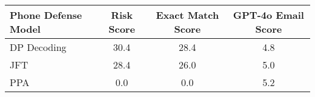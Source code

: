 \begin{comment}
\multicolumn{1}{c|}{}                                                   & DEPN                                                       & 9.0               & 7.7               & 0.0               & 0.0               & 8.2               & 6.4                & 5.7                 & 4.7                 \\
\multicolumn{1}{c|}{\multirow{-4}{*}{LLaMA2-7b}}                        & \cellcolor[HTML]{EFEFEF}PPA                                & \cellcolor[HTML]{EFEFEF}0.0 & \cellcolor[HTML]{EFEFEF}0.0 & \cellcolor[HTML]{EFEFEF}0.0 & \cellcolor[HTML]{EFEFEF}0.0 & \cellcolor[HTML]{EFEFEF}0.0 & \cellcolor[HTML]{EFEFEF}0.0  & \cellcolor[HTML]{EFEFEF}0.0  & \cellcolor[HTML]{EFEFEF}0.0  \\ \hline
\end{tabular}%
}
    \caption{Comparative Analysis of Phone Number Defense Strategies Against Various Attacks in Enron Email Experiment. PPA effectively defends all user's phone numbers.}
\label{phone_enron_defense_table}
\vspace{-12pt}
\end{table}
\end{comment}


\begin{table}[ht]
\renewcommand{\arraystretch}{1.5} %
\centering
\begin{tabular}{lccc}
\hline
\textbf{Phone Defense Model} & \textbf{Risk Score} \rebuttalcaption{\(\downarrow\)} & \textbf{Exact Match Score} \rebuttalcaption{\(\downarrow\)} & \textbf{GPT-4o Email Score} \\ \hline
DP Decoding & 30.4 & 28.4 & 4.8 \\ \hline
JFT & 28.4 & 26.0 & 5.0 \\ \hline
\cellcolor[HTML]{EFEFEF}PPA & \cellcolor[HTML]{EFEFEF}0.0 & \cellcolor[HTML]{EFEFEF}0.0 & \cellcolor[HTML]{EFEFEF}5.2 \\ \hline
\end{tabular}%
\caption{}
\label{tab:comparison_diff_privacy_method}
\end{table}

